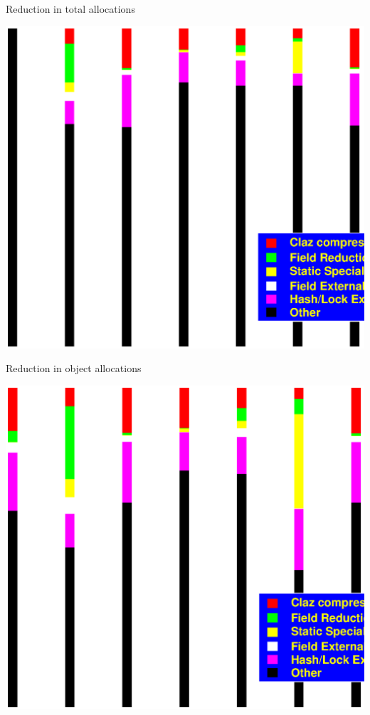 \documentclass[%
pdf,
colorBG,
slideColor,
nototal,
oqe
]{prosper}
\begin{document}
\begin{slide}{Reduction in total allocations}
\begin{center}
\includegraphics[scale=0.45]{Figures/oopsla-ttlalloc-color.eps}
\end{center}
\end{slide}

\begin{slide}{Reduction in object allocations}
\begin{center}
\includegraphics[scale=0.45]{Figures/oopsla-objalloc-color.eps}
\end{center}
\end{slide}
\end{document}
